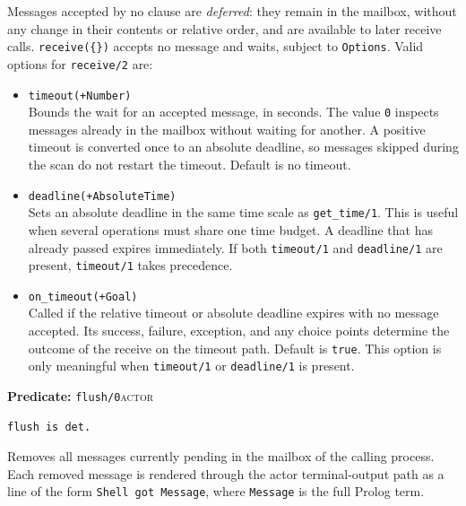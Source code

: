 Messages accepted by no clause are \emph{deferred}: they remain in the mailbox,
without any change in their contents or relative order, and are available to
later receive calls. \texttt{receive(\{\})} accepts no message and waits,
subject to \texttt{Options}. Valid options for \texttt{receive/\allowbreak{}2} are:

\begin{itemize}
\item
  \texttt{timeout(\allowbreak{}+Number)}\\
  Bounds the wait for an accepted message, in seconds. The value \texttt{0}
  inspects messages already in the mailbox without waiting for another. A
  positive timeout is converted once to an absolute deadline, so messages
  skipped during the scan do not restart the timeout. Default is no timeout.
\item
  \texttt{deadline(\allowbreak{}+AbsoluteTime)}\\
  Sets an absolute deadline in the same time scale as \texttt{get\_\allowbreak{}time/\allowbreak{}1}.
  This is useful when several operations must share one time budget. A
  deadline that has already passed expires immediately. If both
  \texttt{timeout/\allowbreak{}1} and \texttt{deadline/\allowbreak{}1} are present, \texttt{timeout/\allowbreak{}1}
  takes precedence.
\item
  \texttt{on\_\allowbreak{}timeout(\allowbreak{}+Goal)}\\
  Called if the relative timeout or absolute deadline expires with no message
  accepted. Its success, failure, exception, and any choice points determine
  the outcome of the receive on the timeout path. Default is \texttt{true}.
  This option is only meaningful when \texttt{timeout/\allowbreak{}1} or
  \texttt{deadline/\allowbreak{}1} is present.
\end{itemize}

\medskip

\noindent \textbf{Predicate:} \texttt{flush/\allowbreak{}0}\hfill\textsc{actor}

\begin{verbatim}
flush is det.
\end{verbatim}

\noindent Removes all messages currently pending in the mailbox of the
calling process. Each removed message is rendered through the actor
terminal-output path as a line of the form
\texttt{Shell\,\allowbreak{}got\,\allowbreak{}Message}, where \texttt{Message} is the full Prolog term.

